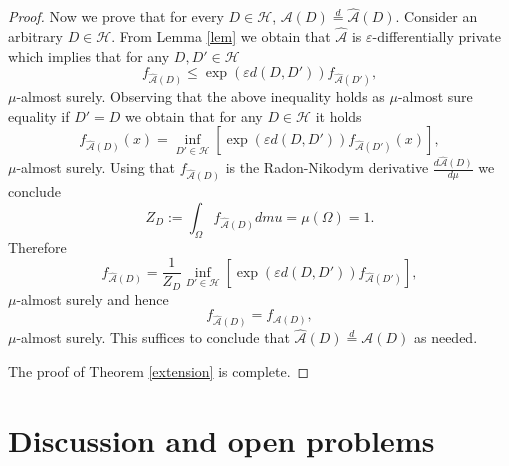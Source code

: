 \documentclass[12pt,a4paper]{article}
\numberwithin{equation}{section}
\numberwithin{equation}{section}
\renewcommand{\epsilon}{\varepsilon}
\newcommand{\1}{{\text{\Large $\mathfrak 1$}}}
\newcommand{\2}[1]{{\text{\Large $\mathfrak 1$}\!\left(#1\right)}}
\begin{document}
\begin{proof}
Now we prove that for every $D \in \mathcal{H}$, $\mathcal{A}(D) \overset{d}{=}  \hat{\mathcal{A}}(D)$. Consider an arbitrary $D \in \mathcal{H}$. From Lemma \ref{lem} we obtain that $\hat{\mathcal{A}}$ is $\epsilon$-differentially private which implies that for any $D,D' \in \mathcal{H}$ \begin{equation}  f_{\hat{\mathcal{A}}(D)} \leq \exp \left(\epsilon d(D,D') \right) f_{\hat{\mathcal{A}}(D')},   \end{equation} $\mu$-almost surely. Observing that the above inequality holds as $\mu$-almost sure equality if $D'=D$ we obtain that for any $D \in \mathcal{H}$ it holds $$f_{\hat{\mathcal{A}}(D)}(x)=\inf_{D' \in \mathcal{H}}  \left[ \exp \left( \epsilon d(D,D') \right) f_{\hat{\mathcal{A}}(D')}(x) \right],$$ $\mu$-almost surely. Using that $f_{\hat{\mathcal{A}}(D)}$ is the Radon-Nikodym derivative $\frac{d \hat{\mathcal{A}}(D)}{d \mu}$  we conclude $$Z_{D}:=\int_{\Omega} f_{\hat{\mathcal{A}}(D)} dmu=\mu(\Omega)=1.$$ Therefore $$f_{\hat{\mathcal{A}}(D)}=\frac{1}{Z_D}\inf_{D' \in \mathcal{H}}  \left[ \exp \left( \epsilon d(D,D') \right) f_{\hat{\mathcal{A}}(D')} \right],$$ $\mu$-almost surely and hence $$ f_{\hat{\mathcal{A}}(D)}=f_{\mathcal{A}(D)},$$ $\mu$-almost surely. This suffices to conclude that $\hat{\mathcal{A}}(D) \overset{d}{=}  \mathcal{A}(D)$ as needed. 

The proof of Theorem \ref{extension} is complete.
\end{proof}

\section{Discussion and open problems}
\end{document}
